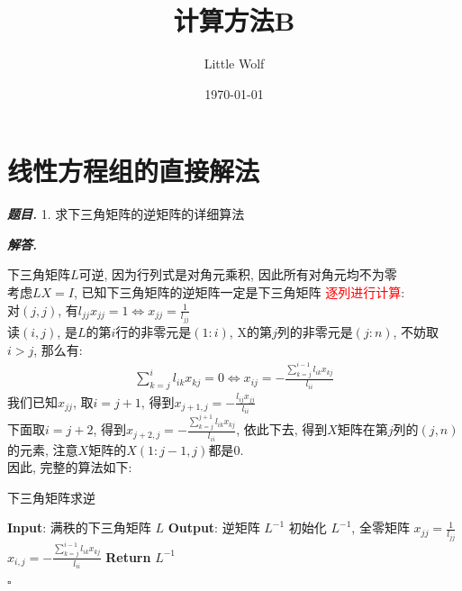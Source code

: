 \documentclass[10pt, a4paper, oneside]{ctexart}
\title{\textbf{计算方法B}}
\author{Little Wolf}
\date{\today}
\newenvironment{problem}{\begin{framed}\par\noindent\textbf{\textit{题目. }}}{\end{framed}\par}
\newenvironment{solution}{%
  \par\noindent\textbf{\textit{解答. }}\ignorespaces
}{%
  \hfill\ensuremath{\square}\par %
}
\begin{document}
\maketitle

\tableofcontents
\newpage

\section{线性方程组的直接解法}
\begin{problem}
    1. 求下三角矩阵的逆矩阵的详细算法
\end{problem}
\begin{solution}
下三角矩阵$L$可逆, 因为行列式是对角元乘积, 因此所有对角元均不为零\\
考虑$LX=I$, 已知下三角矩阵的逆矩阵一定是下三角矩阵
\textcolor{red}{逐列进行计算}:\\
对$(j,j)$, 有$l_{jj}x_{jj}=1 \iff x_{jj}=\frac{1}{l_{jj}}$\\
读$(i,j)$, 是$L$的第$i$行的非零元是$(1:i)$, X的第$j$列的非零元是$(j:n)$, 不妨取$i>j$, 那么有:
\begin{align*}
    \sum_{k=j}^{i} l_{ik}x_{kj}=0 \iff x_{ij}=-\frac{\sum_{k=j}^{i-1}l_{ik}x_{kj}}{l_{ii}}
\end{align*}
我们已知$x_{jj}$, 取$i=j+1$, 得到$x_{j+1,j}=-\frac{l_{ij}x_{jj}}{l_{ii}}$\\
下面取$i=j+2$, 得到$x_{j+2,j}=-\frac{\sum_{k=j}^{j+1}l_{ik}x_{kj}}{l_{ii}}$, 依此下去, 得到$X$矩阵在第$j$列的$(j,n)$的元素, 注意$X$矩阵的$X(1:j-1, j)$都是$0$.\\
因此, 完整的算法如下:
\begin{algorithm}
    \caption{下三角矩阵求逆}
    \begin{algorithmic}
        \State \textbf{Input}: 满秩的下三角矩阵 \( L \)
        \State \textbf{Output}: 逆矩阵 \( L^{-1} \)
        \State 初始化 \( L^{-1} \), 全零矩阵
        \State $x_{jj}=\frac{1}{l_{jj}}$
            \State $x_{i,j}=-\frac{\sum_{k=j}^{i-1}l_{ik}x_{kj}}{l_{ii}}$
            \EndFor
        \EndFor
        \State \textbf{Return} \( L^{-1} \)
    \end{algorithmic}
    \end{algorithm} 
\end{solution}
\end{document}
